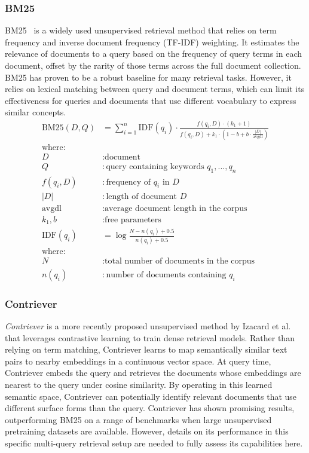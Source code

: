 \subsubsection{BM25}
BM25~\cite{bm25} is a widely used unsupervised retrieval method that relies on term frequency and inverse document frequency (TF-IDF) weighting.
It estimates the relevance of documents to a query based on the frequency of query terms in each document, offset by the rarity of those terms across the full document collection.
BM25 has proven to be a robust baseline for many retrieval tasks.
However, it relies on lexical matching between query and document terms, which can limit its effectiveness for queries and documents that use different vocabulary to express similar concepts.
\begin{align*}
    \text{BM25}(D,Q) &= \sum_{i=1}^n \text{IDF}(q_i) \cdot \frac{f(q_i, D) \cdot (k_1 + 1)}{f(q_i, D) + k_1 \cdot (1 - b + b \cdot \frac{|D|}{\text{avgdl}})} \\[2ex]
    \text{where:} \\
    D &: \text{document} \\
    Q &: \text{query containing keywords } q_1, ..., q_n \\
    f(q_i, D) &: \text{frequency of } q_i \text{ in } D \\
    |D| &: \text{length of document } D \\
    \text{avgdl} &: \text{average document length in the corpus} \\
    k_1, b &: \text{free parameters} \\[2ex]
    \text{IDF}(q_i) &= \log \frac{N - n(q_i) + 0.5}{n(q_i) + 0.5} \\[2ex]
    \text{where:} \\
    N &: \text{total number of documents in the corpus} \\
    n(q_i) &: \text{number of documents containing } q_i
\end{align*}

\subsubsection{Contriever}
\textit{Contriever} is a more recently proposed unsupervised method by Izacard et al.\cite{izacard2022unsuperviseddenseinformationretrieval} that leverages contrastive learning to train dense retrieval models.
Rather than relying on term matching, Contriever learns to map semantically similar text pairs to nearby embeddings in a continuous vector space.
At query time, Contriever embeds the query and retrieves the documents whose embeddings are nearest to the query under cosine similarity.
By operating in this learned semantic space, Contriever can potentially identify relevant documents that use different surface forms than the query.
Contriever has shown promising results, outperforming BM25 on a range of benchmarks when large unsupervised pretraining datasets are available.
However, details on its performance in this specific multi-query retrieval setup are needed to fully assess its capabilities here.

